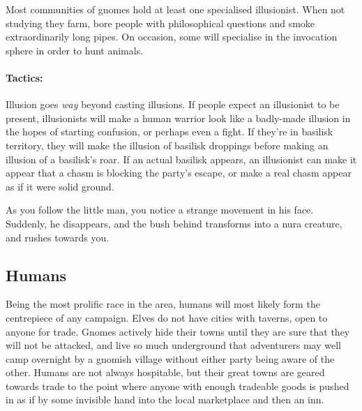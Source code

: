 \begin{multicols}{2}

\label{gnomish_illusionist}

Most communities of gnomes hold at least one specialised illusionist.  When not studying they farm, bore people with philosophical questions and smoke extraordinarily long pipes.  On occasion, some will specialise in the invocation sphere in order to hunt animals.


\paragraph{Tactics:} Illusion goes \emph{way} beyond casting illusions.
If people expect an illusionist to be present, illusionists will make a human warrior look like a badly-made illusion in the hopes of starting confusion, or perhaps even a fight.
If they're in basilisk territory, they will make the illusion of basilisk droppings before making an illusion of a basilisk's roar.
If an actual basilisk appears, an illusionist can make it appear that a chasm is blocking the party's escape, or make a real chasm appear as if it were solid ground.

\begin{boxtext}

  As you follow the little man, you notice a strange movement in his face.
  Suddenly, he disappears, and the bush behind transforms into a nura creature, and rushes towards you.

\end{boxtext}

\subsection{Humans}

Being the most prolific race in the area, humans will most likely form the centrepiece of any campaign.  Elves do not have cities with taverns, open to anyone for trade.  Gnomes actively hide their towns until they are sure that they will not be attacked, and live so much underground that adventurers may well camp overnight by a gnomish village without either party being aware of the other.  Humans are not always hospitable, but their great towns are geared towards trade to the point where anyone with enough tradeable goods is pushed in as if by some invisible hand into the local marketplace and then an inn.


\end{multicols}
